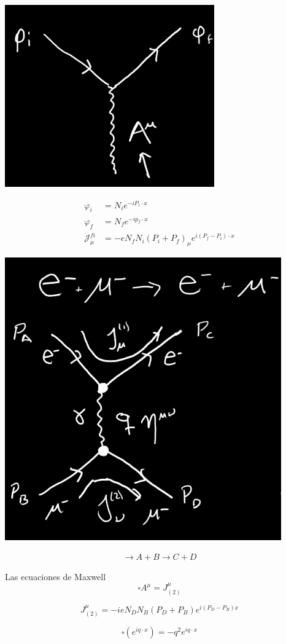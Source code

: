 \documentclass[a4paper,12pt]{article}
\begin{document}
\begin{minipage}{0.9\textwidth}
\begin{multicols}{2}  
    \includegraphics[width=8 cm]{0321.png}
 
 
\begin{align*}
    \varphi_i &= N_i e^{-i P_i \cdot x}\\
    \varphi_f &= N_f e^{-i p_f \cdot x } \\ 
    \mathcal{J}_\mu ^{fi} &= -e N_fN_i (P_i +P_f )_ \mu e^{i (P_f -P_i )\cdot x }
\end{align*}
\end{multicols}
\begin{multicols}{2}
    
\includegraphics[width= 0.5 \textwidth ]{1321.png}

\begin{align*}
\to A+B \to C+D    
\end{align*}

Las ecuaciones de Maxwell
\[
\square A^\mu = J^\mu_{(2)} 
\]

\[
J_{(2)}^{\mu}  =- i e N_D N_B (P_D+P_B) e^{i (P_D -P_B)x}
\]

\[
\square (e^{iq\cdot x }) = - q^2 e^{iq \cdot x } 
\]



\end{multicols}
  

\end{minipage}
\end{document}
